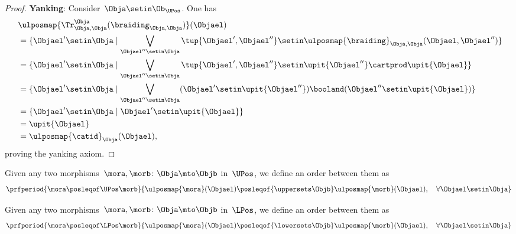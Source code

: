 \begin{proof}
    \textbf{Yanking}:
    Consider~$\Obja\setin \Ob_{\UPos}$.
    One has
    \begin{equation*}
        \begin{aligned}
            ~ & \ulposmap{\Tr_{\Obja,\Obja}^{\Obja}(\braiding_{\Obja,\Obja})}(\Objael) \\
              & =\{ \Objael'\setin \Obja \mid \bigvee_{\Objael''\setin \Obja}\tup{\Objael',\Objael''}\setin \ulposmap{\braiding}_{\Obja,\Obja}(\Objael,\Objael'')\} \\
              & =\{ \Objael'\setin \Obja \mid \bigvee_{\Objael''\setin \Obja}\tup{\Objael',\Objael''}\setin \upit\{\Objael''\}\cartprod \upit\{ \Objael\}\} \\
              & =\{ \Objael'\setin \Obja \mid \bigvee_{\Objael''\setin \Obja} (\Objael'\setin \upit\{\Objael''\}) \booland(\Objael'' \setin \upit\{ \Objael\})\} \\
              & =\{ \Objael'\setin \Obja \mid \Objael'\setin \upit\{\Objael\}\} \\
              & =\upit \{\Objael\} \\
              & =\ulposmap{\catid}_\Obja(\Objael),
        \end{aligned}
    \end{equation*}
    proving the yanking axiom.
\end{proof}

\begin{definition}
    \label{def:upos_order}
    Given any two morphisms~$\mora,\morb\colon \Obja \mto \Objb$ in~$\UPos$, we define an order between them as
    \begin{equation*}
        \prfperiod{\mora \posleqof\UPos \morb}{\ulposmap{\mora}(\Objael)\posleqof{\uppersets \Objb} \ulposmap{\morb}(\Objael), \quad \forall \Objael \setin \Obja}
    \end{equation*}
\end{definition}

\begin{definition}
    \label{def:lpos_order}
    Given any two morphisms~$\mora,\morb\colon \Obja \mto \Objb$ in~$\LPos$, we define an order between them as
    \begin{equation*}
        \prfperiod{\mora \posleqof\LPos \morb}{\ulposmap{\mora}(\Objael)\posleqof{\lowersets \Objb} \ulposmap{\morb}(\Objael), \quad \forall \Objael \setin \Obja}
    \end{equation*}
\end{definition}

